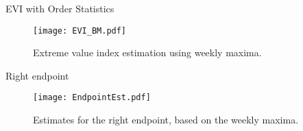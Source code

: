 \documentclass[notes]{beamer}
\begin{document}

\begin{frame}{EVI with Order Statistics }
\begin{figure}
\begin{center}
\texttt{[image: EVI\_BM.pdf]}
\caption{Extreme value index estimation using weekly maxima.} \label{fig:POTEst}
\end{center}
\end{figure}
\end{frame}


\begin{frame}{Right endpoint}
\begin{figure}
\begin{center}
\texttt{[image: EndpointEst.pdf]}
\caption{Estimates for the right endpoint, based on the weekly maxima.} \label{fig:EndPointEst}
\end{center}
\end{figure}
\end{frame}
\end{document}
